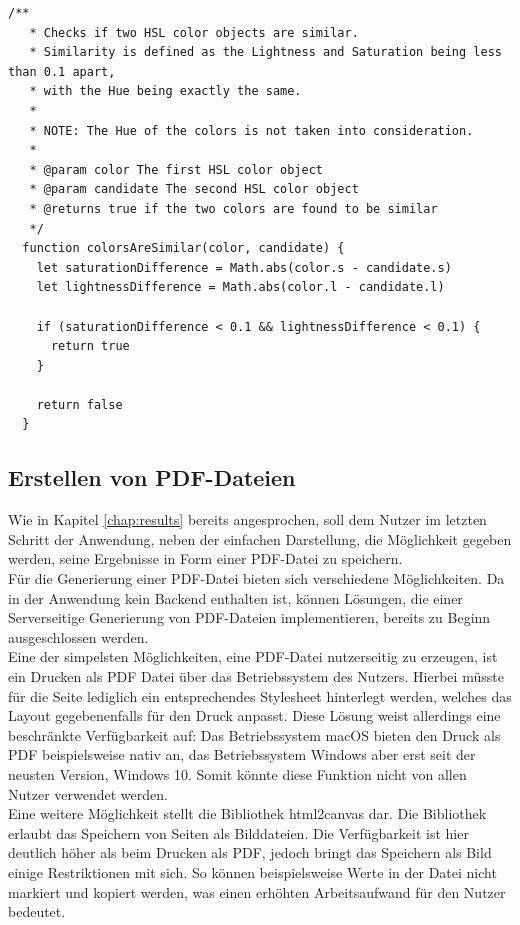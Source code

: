 \begin{lstlisting}[caption=Überprüfen der Ähnlichkeit zweier Farben, label=lst:similar]
  /**
   * Checks if two HSL color objects are similar.
   * Similarity is defined as the Lightness and Saturation being less than 0.1 apart,
   * with the Hue being exactly the same.
   *
   * NOTE: The Hue of the colors is not taken into consideration.
   *
   * @param color The first HSL color object
   * @param candidate The second HSL color object
   * @returns true if the two colors are found to be similar
   */
  function colorsAreSimilar(color, candidate) {
    let saturationDifference = Math.abs(color.s - candidate.s)
    let lightnessDifference = Math.abs(color.l - candidate.l)

    if (saturationDifference < 0.1 && lightnessDifference < 0.1) {
      return true
    }

    return false
  }
\end{lstlisting}


\subsection{Erstellen von PDF-Dateien}
\label{chap:pdf}
Wie in Kapitel \ref{chap:results} bereits angesprochen, soll dem Nutzer im letzten Schritt der Anwendung, neben der einfachen Darstellung, die Möglichkeit gegeben werden, seine Ergebnisse in Form einer PDF-Datei zu speichern.\\
Für die Generierung einer PDF-Datei bieten sich verschiedene Möglichkeiten. Da in der Anwendung kein Backend enthalten ist, können Lösungen, die einer Serverseitige Generierung von PDF-Dateien implementieren, bereits zu Beginn ausgeschlossen werden.\\

Eine der simpelsten Möglichkeiten, eine PDF-Datei nutzerseitig zu erzeugen, ist ein Drucken als PDF Datei über das Betriebssystem des Nutzers. Hierbei müsste für die Seite lediglich ein entsprechendes Stylesheet hinterlegt werden, welches das Layout gegebenenfalls für den Druck anpasst. Diese Lösung weist allerdings eine beschränkte Verfügbarkeit auf: Das Betriebssystem macOS bieten den Druck als PDF beispielsweise nativ an, das Betriebssystem Windows aber erst seit der neusten Version, Windows 10. Somit könnte diese Funktion nicht von allen Nutzer verwendet werden.\\

Eine weitere Möglichkeit stellt die Bibliothek html2canvas\footnotemark{} dar. Die Bibliothek erlaubt das Speichern von Seiten als Bilddateien. Die Verfügbarkeit ist hier deutlich höher als beim Drucken als PDF, jedoch bringt das Speichern als Bild einige Restriktionen mit sich. So können beispielsweise Werte in der Datei nicht markiert und kopiert werden, was einen erhöhten Arbeitsaufwand für den Nutzer bedeutet.

